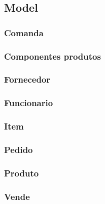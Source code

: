 \subsection{Model}
\subsubsection{Comanda}

\subsubsection{Componentes produtos}

\subsubsection{Fornecedor}

\subsubsection{Funcionario}

\subsubsection{Item}

\subsubsection{Pedido}

\subsubsection{Produto}

\subsubsection{Vende}

  \newpage
  